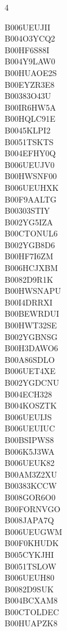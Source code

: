 \begin{multicols}{4}
	\raggedright B006UEUJII\\ B004O3YCQ2\\ B00HF6S88I\\ B004Y9LAW0\\ B00HUAOE2S\\
	B00EYZR3E8\\ B00383O43U\\ B00IR6HW5A\\ B00HQLC91E\\ B0045KLPI2\\ B0051TSKTS\\
	B004EFHY0Q\\ B006UEUJV0\\ B00HWSNF00\\ B006UEUHXK\\ B00F9AALTG\\ B00303STIY\\
	B002YG5IZA\\ B00CTONUL6\\ B002YGB8D6\\ B00HF7I6ZM\\ B006HCJXBM\\ B0082D9R1K\\
	B00HWSNAPU\\ B00I4DRRXI\\ B00BEWRDUI\\ B00HWT32SE\\ B002YGBNSG\\ B00H3DAWO6\\
	B00A86SDLO\\ B006UET4XE\\ B002YGDCNU\\ B004ECH328\\ B004KOSZTK\\ B006UEUIJS\\
	B006UEUIUC\\ B00BSIPWS8\\ B006K5J3WA\\ B006UEUK82\\ B00AM3Z2XU\\ B00383KCCW\\
	B008GOR6O0\\ B00FORNVGO\\ B008JAPA7Q\\ B006UEUGWM\\ B00F0KHUDK\\ B005CYKJHI\\
	B0051TSLOW\\ B006UEUH80\\ B0082D9SUK\\ B004BCXAM8\\ B00CTOLDEC\\ B00HUAPZK8\\

\end{multicols}
